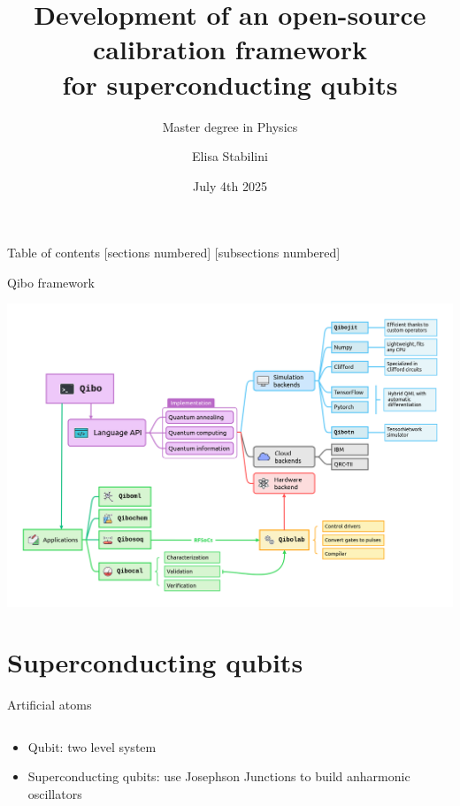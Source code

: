 \documentclass[aspectratio=169,10pt]{beamer}
\title{Development of an open-source calibration framework\\ for superconducting qubits}
\subtitle{Master degree in Physics}
\author{Elisa Stabilini}
\institute{Università degli Studi di Milano - Department of Physics}
\date{July 4th 2025}
\begin{document}
\maketitle

\begin{frame}{Table of contents}
    [sections numbered]
    [subsections numbered]  
    \tableofcontents[hideallsubsections]
\end{frame}

\begin{frame}[t,fragile]{Qibo framework}
  \begin{center}
      \includegraphics[height=0.80\paperheight]{figures/qibo_ecosystem.png}
  \end{center}
\end{frame}

\section{Superconducting qubits}

\begin{frame}[t,fragile]{Artificial atoms}
  \begin{columns}
    \begin{column}{0.5\textwidth}
      \begin{itemize}
        \item Qubit: two level system
        \item Superconducting qubits: use Josephson Junctions to build anharmonic oscillators
      \end{itemize}
    \end{column}
    \begin{column}{0.5\textwidth}
      
    \end{column}
  \end{columns}
\end{frame}
\end{document}
